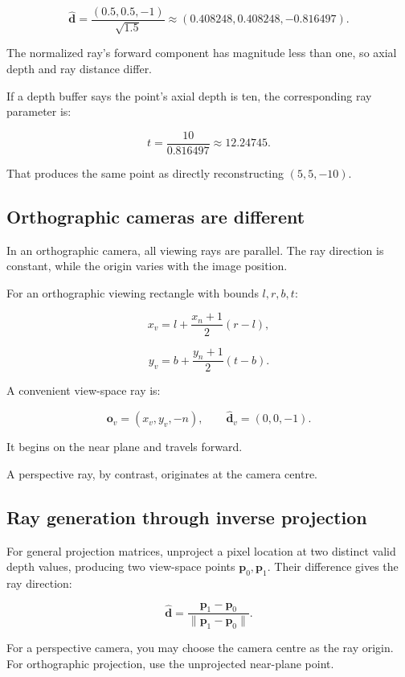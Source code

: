 \[ \boxed{ \hat{\mathbf d} = \frac{(0.5,0.5,-1)}{\sqrt{1.5}} \approx (0.408248,0.408248,-0.816497). } \]

The normalized ray's forward component has magnitude less than one, so axial depth and ray distance differ.

If a depth buffer says the point's axial depth is ten, the corresponding ray parameter is:

\[ t=\frac{10}{0.816497}\approx12.24745. \]

That produces the same point as directly reconstructing \((5,5,-10)\).

\subsection{Orthographic cameras are different}\label{02-foundations-ii-ch035-orthographic-cameras-are-different}

In an orthographic camera, all viewing rays are parallel. The ray direction is constant, while the origin varies with the image position.

For an orthographic viewing rectangle with bounds \(l,r,b,t\):

\[ x_v=l+\frac{x_n+1}{2}(r-l), \]

\[ y_v=b+\frac{y_n+1}{2}(t-b). \]

A convenient view-space ray is:

\[ \boxed{ \mathbf o_v=(x_v,y_v,-n), \qquad \hat{\mathbf d}_v=(0,0,-1). } \]

It begins on the near plane and travels forward.

A perspective ray, by contrast, originates at the camera centre.

\subsection{Ray generation through inverse projection}\label{02-foundations-ii-ch035-ray-generation-through-inverse-projection}

For general projection matrices, unproject a pixel location at two distinct valid depth values, producing two view-space points \(\mathbf p_0,\mathbf p_1\). Their difference gives the ray direction:

\[ \boxed{ \hat{\mathbf d}= \frac{\mathbf p_1-\mathbf p_0} {\|\mathbf p_1-\mathbf p_0\|}. } \]

For a perspective camera, you may choose the camera centre as the ray origin. For orthographic projection, use the unprojected near-plane point.

